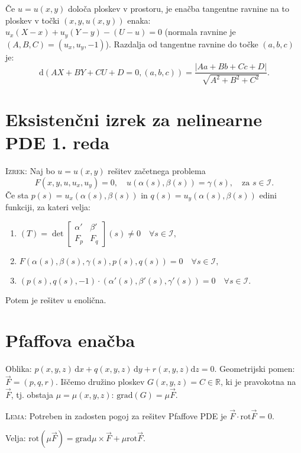 \documentclass[10pt,a4paper]{amsart}
\theoremstyle{definition} %
\theoremstyle{plain} %
\newcommand{\dx}{\ensuremath{\,\mathrm{d}x}}
\newcommand{\dy}{\ensuremath{\,\mathrm{d}y}}
\newcommand{\R}{\mathbb R}
\begin{document}
Če $u = u(x,y)$ določa ploskev v prostoru, je enačba tangentne ravnine na to
ploskev v točki $(x,y,u(x,y))$ enaka: $u_x (X-x) + u_y (Y-y) - (U-u)=0$ (normala
ravnine je $(A,B,C) = (u_x,u_y,-1)$). Razdalja od tangentne ravnine do točke
$(a,b,c)$ je: $$ \text{d}(AX+BY+CU+D=0, (a,b,c)) =
\frac{|Aa+Bb+Cc+D|}{\sqrt{A^2+B^2+C^2}}.  $$


\section*{Eksistenčni izrek za nelinearne PDE 1. reda}

\textsc{Izrek:} Naj bo $u=u(x, y)$ rešitev začetnega problema $$
F(x,y,u,u_x,u_y)=0, \quad u(\alpha(s),\beta(s))=\gamma(s), \quad \text{za } s
\in \mathcal{I}.  $$ Če sta $p(s)=u_x(\alpha(s),\beta(s))$ in $q(s) =
u_y(\alpha(s),\beta(s))$ edini funkciji, za kateri velja: \begin{enumerate}
  \item $ (T) = \det{\begin{bmatrix} \alpha' & \beta' \\ F_p & F_q
  \end{bmatrix}}(s) \neq 0 \quad \forall s \in \mathcal{I},$ \item
    $F(\alpha(s),\beta(s),\gamma(s),p(s),q(s))=0 \quad \forall s \in
    \mathcal{I},$ \item $(p(s),q(s),-1) \cdot (\alpha'(s),\beta'(s),\gamma'(s))
      = 0 \quad \forall s \in \mathcal{I}.$ \end{enumerate} Potem je rešitev $u$
  enolična.


\section*{Pfaffova enačba}

Oblika: $p(x,y,z)\dx+q(x,y,z)\dy+r(x,y,z)\text{d}z = 0$. Geometrijski pomen:
$\vec{F} = (p,q,r)$. Iščemo družino ploskev $G(x,y,z) = C \in \R$, ki je
pravokotna na $\vec{F}$, tj. obstaja $\mu = \mu(x,y,z)$: $\text{grad}(G) = \mu
\vec{F}$.

\textsc{Lema:} Potreben in zadosten pogoj za rešitev Pfaffove PDE je $\vec{F}
\cdot \text{rot}\vec{F} = 0$.

Velja: $\text{rot}(\mu \vec{F}) = \text{grad}\mu \times \vec{F} + \mu \text{rot}
\vec{F}$.
\end{document}
